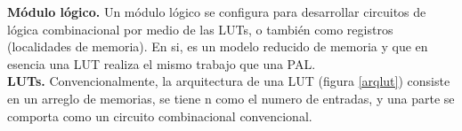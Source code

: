 \documentclass[twoside,spanish,ESP,MSc]{plantillaLabUPV}
\theoremstyle{definition}
\begin{document}
\checkmark\textbf{Módulo lógico.} Un módulo lógico se configura para desarrollar circuitos de lógica combinacional por medio de las LUTs, o también como registros (localidades de memoria). En si, es un modelo reducido de memoria  y que en esencia una LUT realiza el mismo trabajo que una PAL.\\


\checkmark\textbf{LUTs.} Convencionalmente, la arquitectura de una LUT (figura \ref{arqlut}) consiste en un arreglo de memorias, se tiene n como el numero de entradas, y una parte se comporta como un circuito combinacional convencional.\\

\end{document}

